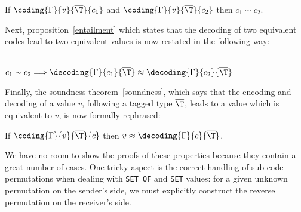 \begin{proposition}
If $\coding{\Gamma}{v}{\overline{\T}}{c_1}$ and
$\coding{\Gamma}{v}{\overline{\T}}{c_2}$ then $c_1 \sim c_2$.
\end{proposition}

Next, proposition~\ref{entailment} which states that the decoding of
two equivalent codes lead to two equivalent values is now restated in
the following way:

\begin{proposition}\\
$c_1 \sim c_2 \Longrightarrow \decoding{\Gamma}{c_1}{\overline{\T}}
  \approx \decoding{\Gamma}{c_2}{\overline{\T}}$
\end{proposition}

Finally, the soundness theorem~\ref{soundness}, which says that the
encoding and decoding of a \core value $v$, following a \core tagged
type $\overline{\T}$, leads to a value which is equivalent to $v$, is
now formally rephrased:

\begin{theorem}[Soundness]
If $\coding{\Gamma}{v}{\overline{\T}}{c}$ then $v \approx
\decoding{\Gamma}{c}{\overline{\T}}$.
\end{theorem}

We have no room to show the proofs of these properties because they
contain a great number of cases. One tricky aspect is the correct
handling of sub-code permutations when dealing with \texttt{\small SET
OF} and \texttt{\small SET} values: for a given unknown permutation on
the sender's side, we must explicitly construct the reverse
permutation on the receiver's side.
